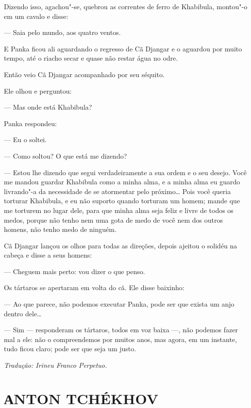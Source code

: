 Dizendo isso, agachou"-se, quebrou as correntes de ferro de Khabibula,
montou"-o em um cavalo e disse:

--- Saia pelo mundo, aos quatro ventos.

E Panka ficou ali aguardando o regresso de Cã Djangar e o aguardou por
muito tempo, até o riacho secar e quase não restar água no odre.

Então veio Cã Djangar acompanhado por seu séquito.

Ele olhou e perguntou:

--- Mas onde está Khabibula?

Panka respondeu:

--- Eu o soltei.

--- Como soltou? O que está me dizendo?

--- Estou lhe dizendo que segui verdadeiramente a sua ordem e o seu
desejo. Você me mandou guardar Khabibula como a minha alma, e a minha
alma eu guardo livrando"-a da necessidade de se atormentar pelo
próximo\ldots{} Pois você queria torturar Khabibula, e eu não suporto quando
torturam um homem; mande que me torturem no lugar dele, para
que minha alma seja feliz e livre de todos os medos, porque não tenho
nem uma gota de medo de você nem dos outros homens, não tenho medo de
ninguém.

Cã Djangar lançou os olhos para todas as direções, depois ajeitou
o solidéu na cabeça e disse a seus homens:

--- Cheguem mais perto: vou dizer o que penso.

Os tártaros se apertaram em volta do cã. Ele disse baixinho:

--- Ao que parece, não podemos executar Panka, pode ser que exista um
anjo dentro dele\ldots{}

--- Sim --- responderam os tártaros, todos em voz baixa ---, não podemos
fazer mal a ele: não o compreendemos por muitos anos, mas agora, em um
instante, tudo ficou claro; pode ser que seja um justo.

\medskip

{\footnotesize\hfill\emph{Tradução: Irineu Franco Perpetuo.}}




\part[АNTON TCHÉKHOV]{АNTON TCHÉKHOV }

